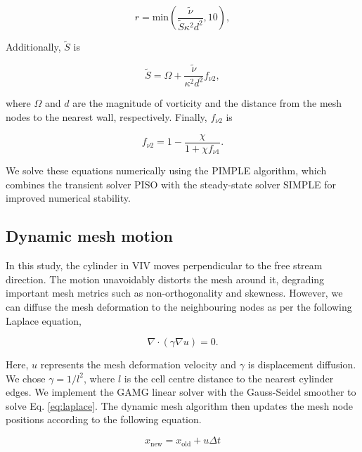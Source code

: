\documentclass[a4paper,fleqn]{cas-sc}
\begin{document}
\begin{equation}
  r = \text{min} \left( \frac{\tilde{\nu}}{\tilde{S} \kappa^{2} d^{2}}, 10 \right),
  \label{eq:r}
\end{equation}

Additionally, $\tilde{S}$ is

\begin{equation}
  \tilde{S} = \Omega + \frac{\tilde{\nu}}{\kappa^{2} d^{2}} f_{\nu 2},
  \label{eq:sTilde}
\end{equation}

\noindent where $\Omega$ and $d$ are the magnitude of vorticity and the distance from the mesh nodes to the nearest wall, respectively. Finally, $f_{\nu 2}$ is

\begin{equation}
  f_{\nu 2} = 1 - \frac{\chi}{1 + \chi f_{\nu 1}}.
  \label{eq:fv2}
\end{equation}

\noindent We solve these equations numerically using the PIMPLE algorithm, which combines the transient solver PISO with the steady-state solver SIMPLE for improved numerical stability.

\subsection{Dynamic mesh motion} \label{ssec:dynMesh}

In this study, the cylinder in VIV moves perpendicular to the free stream direction. The motion unavoidably distorts the mesh around it, degrading important mesh metrics such as non-orthogonality and skewness. However, we can diffuse the mesh deformation to the neighbouring nodes as per the following Laplace equation,

\begin{equation}
  \nabla \cdot \left( \gamma \nabla u \right) = 0.
  \label{eq:laplace}
\end{equation}

\noindent Here, $u$ represents the mesh deformation velocity and $\gamma$ is displacement diffusion. We chose $\gamma = 1/l^{2}$, where $l$ is the cell centre distance to the nearest cylinder edges. We implement the GAMG linear solver with the Gauss-Seidel smoother to solve Eq. \ref{eq:laplace}. The dynamic mesh algorithm then updates the mesh node positions according to the following equation.

\begin{equation}
  x_{\text{new}} = x_{\text{old}} + u \Delta t
  \label{eq:meshNodeUpdate}
\end{equation}
\end{document}

